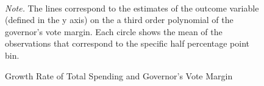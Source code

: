 \documentclass[dv_diss_main.tex]{subfiles}
\begin{document}
\newpage

\begin{figure}[h]
	\begin{center}

    \\
    \caption{Growth Rate of Total Spending and Governor's Vote Margin}\label{fig:rddplottotspending}
	\end{center}
	\vspace{0.5em}
    \begin{figurenotes}
    \footnotesize	
	\textit{Note. }The lines correspond to the estimates of the outcome variable  (defined in the y axis) on the a third order polynomial of the governor's vote margin. Each circle shows the mean of the observations that correspond to the specific half percentage point bin. 
	\end{figurenotes}

\end{figure}
\end{document}
